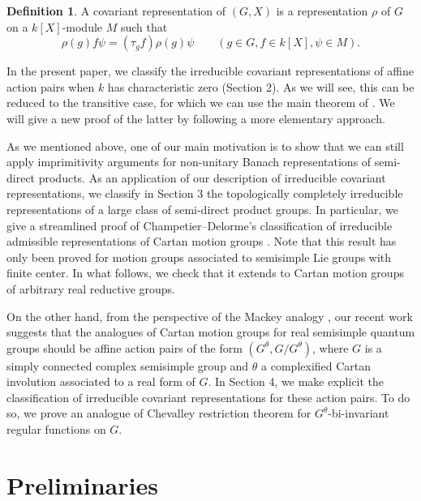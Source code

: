 \documentclass{amsart}
\theoremstyle{definition}
\newtheorem{definition}[theorem]{Definition}
\begin{document}
\begin{definition} \label{module}
    A covariant representation of $(G,X)$ is a representation $\rho$ of $G$ on a $k[X]$-module $M$ such that
    $$\rho(g)f\psi = (\tau_gf)\rho(g)\psi \qquad (g \in G, f\in k[X], \psi \in M).$$
\end{definition}

In the present paper, we classify the irreducible covariant representations of affine action pairs when $k$ has characteristic zero (Section 2). As we will see, this can be reduced to the transitive case, for which we can use the main theorem of \cite{2authors}. We will give a new proof of the latter by following a more elementary approach.


As we mentioned above, one of our main motivation is to show that we can still apply imprimitivity arguments for non-unitary Banach representations of semi-direct products. As an application of our description of irreducible covariant representations, we classify in Section 3 the topologically completely irreducible representations of a large class of semi-direct product groups. In particular, we give a streamlined proof of Champetier--Delorme's classification of irreducible admissible representations of Cartan motion groups \cite{DelormeCh}. Note that this result has only been proved for motion groups associated to semisimple Lie groups with finite center. In what follows, we check that it extends to Cartan motion groups of arbitrary real reductive groups.

On the other hand, from the perspective of the Mackey analogy \cites{Afgoustidis1, MackeyAnalogy, MAhigson, MonkVoigt}, our recent work \cite{YGE} suggests that the analogues of Cartan motion groups for real semisimple quantum groups \cite{DCquantisation} should be affine action pairs of the form $(G^\theta, G /G^\theta)$, where $G$ is a simply connected complex semisimple group and $\theta$ a complexified Cartan involution associated to a real form of $G$. In Section 4, we make explicit the classification of irreducible covariant representations for these action pairs. To do so, we prove an analogue of Chevalley restriction theorem for $G^\theta$-bi-invariant regular functions on $G$.


\section{Preliminaries}
\end{document}
